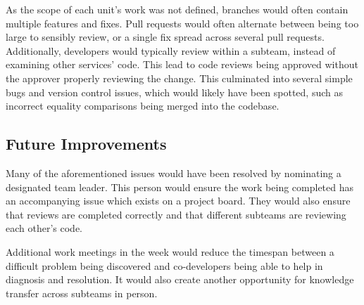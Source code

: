   \par
  As the scope of each unit's work was not defined, branches would often contain multiple features and fixes. Pull requests would often alternate between being too large to sensibly review, or a single fix spread across several pull requests. Additionally, developers would typically review within a subteam, instead of examining other services' code. This lead to code reviews being approved without the approver properly reviewing the change. This culminated into several simple bugs and version control issues, which would likely have been spotted, such as incorrect equality comparisons being merged into the codebase.

  \subsection{Future Improvements}
  Many of the aforementioned issues would have been resolved by nominating a designated team leader. This person would ensure the work being completed has an accompanying issue which exists on a project board. They would also ensure that reviews are completed correctly and that different subteams are reviewing each other's code.

  \par
  Additional work meetings in the week would reduce the timespan between a difficult problem being discovered and co-developers being able to help in diagnosis and resolution. It would also create another opportunity for knowledge transfer across subteams in person.
